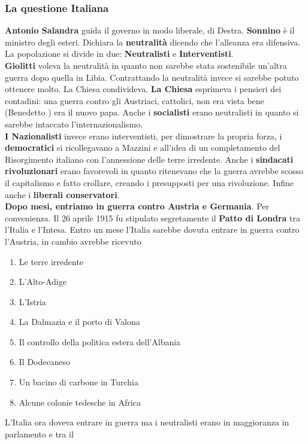 \subsubsection{La questione Italiana}
\textbf{Antonio Salandra} guida il governo in modo liberale, di Destra. \textbf{Sonnino} è il
ministro degli esteri. Dichiara la
\textbf{neutralità} dicendo che l'alleanza era difensiva. La popolazione si divide in due: 
\textbf{Neutralisti} e \textbf{Interventisti}.\\
\textbf{Giolitti} voleva la neutralità in quanto non sarebbe stata sostenibile un'altra guerra dopo
quella in Libia. Contrattando la neutralità invece si sarebbe potuto ottenere molto. La Chiesa
condivideva. \textbf{La Chiesa} esprimeva i pensieri dei contadini: una guerra contro gli Austriaci,
cattolici, non era vista bene (Benedetto ) era il nuovo papa. Anche i \textbf{socialisti} 
erano neutralisti in quanto si sarebbe intaccato l'internazionalismo.\\
\textbf{I Nazionalisti} invece erano interventisti, per dimostrare la propria forza, i 
\textbf{democratici} si ricollegavano a Mazzini e all'idea di un completamento del Risorgimento
italiano con l'annessione delle terre irredente. Anche i \textbf{sindacati rivoluzionari} erano 
favorevoli in quanto ritenevano che la guerra avrebbe scosso il capitalismo e fatto crollare, creando
i presupposti per una rivoluzione. Infine anche i \textbf{liberali conservatori}.\\ [\baselineskip]
\textbf{Dopo mesi, entriamo in guerra contro Austria e Germania}. Per convenienza. Il 26 aprile 1915
fu stipulato segretamente il \textbf{Patto di Londra} tra l'Italia e l'Intesa. Entro un mese l'Italia
sarebbe dovuta entrare in guerra contro l'Austria, in cambio avrebbe ricevuto
\begin{enumerate}
  \item Le terre irredente
  \item L'Alto-Adige
  \item L'Istria
  \item La Dalmazia e il porto di Valona
  \item Il controllo della politica estera dell'Albania
  \item Il Dodecaneso
  \item Un bacino di carbone in Turchia
  \item Alcune colonie tedesche in Africa
\end{enumerate}
L'Italia ora doveva entrare in guerra ma i neutralisti erano in maggioranza in parlamento e tra il
